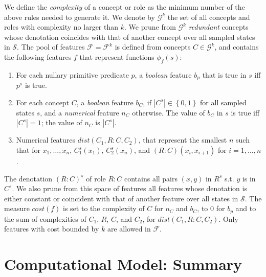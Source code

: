 \documentclass[letterpaper]{article} %
\newcommand{\set}[1]{\ensuremath{\left\{#1 \right\}}}
\newcommand{\F}{\mathcal{F}}
\renewcommand{\S}{\mathcal{S}}
\newcommand{\G}{\mathcal{G}}
\begin{document}
We define the \emph{complexity} of a concept or role as the minimum
number of the above rules needed to generate it. We denote by $\G^k$
the set of all concepts and roles with complexity no larger than $k$.
We prune from $\G^k$ \emph{redundant} concepts whose denotation
coincides with that of another concept over all sampled states
in $\S$. 
%
The pool of features $\F=\F^k$  is defined from concepts $C \in \G^k$, and contains
the following features $f$ that represent functions $\phi_f(s)$:
\begin{enumerate}[{\small$\bullet$}]
\item For each nullary primitive predicate $p$, a \emph{boolean} feature $b_p$ that is true in $s$ iff $p^s$ is true.

\item For each concept $C$, 
a \emph{boolean} feature $b_C$, if $|C^s| \in \set{0,1}$ for all sampled states $s$, 
and a \emph{numerical} feature $n_C$ otherwise. The value of $b_C$ in $s$ is true iff $|C^s| = 1$;
the value of $n_C$ is $|C^s|$.

\item Numerical features $\textit{dist}(C_1,R{:}C,C_2)$, that represent the smallest
  $n$ such that for $x_1, \ldots, x_n$, $C_1^s(x_1)$, $C_2^s(x_{n})$, and
  $(R{:}C)(x_i,x_{i+1})$ for $i=1, \ldots, n$. 
\end{enumerate}  

The denotation $(R{:}C)^s$ of role $R{:}C$ contains all pairs $(x,y)$ in $R^s$
s.t. $y$ is in $C^s$.
We also prune from this space of features all features whose denotation is either constant or coincident with that of another feature over all states in $\S$.
The measure $cost(f)$ is set to the complexity of $C$ for $n_C$ and $b_C$,
to $0$ for $b_p$ and to the sum of complexities of $C_1$, $R$, $C$, and $C_2$, for $\textit{dist}(C_1,R{:}C,C_2)$.
Only features with cost bounded by $k$ are allowed in $\F$.


\section{Computational Model: Summary}
\end{document}
